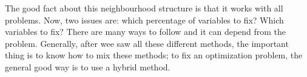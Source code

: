 \documentclass[10pt,a4paper]{article}
\begin{document}
The good fact about this neighbourhood structure is that it works with all
problems. Now, two issues are: which percentage of variables to fix? Which
variables to fix? There are many ways to follow and it can depend from the
problem. Generally, after wee saw all these different methods, the important thing is to
know how to mix these methods; to fix an optimization problem, the general good
way is to use a hybrid method.
\end{document}
